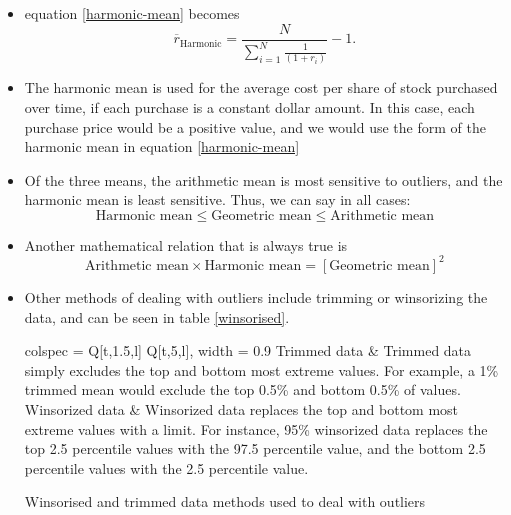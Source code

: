 \documentclass[../notes_compiled.tex]{subfiles}
\begin{document}
\begin{itemize}
\item[] equation \ref{harmonic-mean} becomes
\begin{equation}
\overline{r}_{\text{Harmonic}} = \frac{N}{\sum_{i=1}^{N}\frac{1}{(1+r_{i})}} -1.
\end{equation}

\item The harmonic mean is used for the average cost per share of stock purchased over time, if each purchase is a constant dollar amount. In this case, each purchase price would be a positive value, and we would use the form of the harmonic mean in equation \ref{harmonic-mean}

\item Of the three means, the arithmetic mean is most sensitive to outliers, and the harmonic mean is least sensitive. Thus, we can say in all cases:
\begin{equation}
\text{Harmonic mean} \leq \text{Geometric mean} \leq \text{Arithmetic mean}
\end{equation}

\item Another mathematical relation that is always true is 
\begin{equation}
\text{Arithmetic mean} \times \text{Harmonic mean} = \left[\text{Geometric mean}\right]^{2}
\end{equation}

\item Other methods of dealing with outliers include trimming or winsorizing the data, and can be seen in table \ref{winsorised}.

\begin{table}[h!]
\centering
\begin{tblr}{colspec = {Q[t,1.5,l] Q[t,5,l]}, width = 0.9\textwidth}
\hline[1.25pt]
Trimmed data & Trimmed data simply excludes the top and bottom most extreme values. For example, a 1\% trimmed mean would exclude the top 0.5\% and bottom 0.5\% of values. \\
Winsorized data & Winsorized data replaces the top and bottom most extreme values with a limit. For instance, 95\% winsorized data replaces the top 2.5 percentile values with the 97.5 percentile value, and the bottom 2.5 percentile values with the 2.5 percentile value.\\
\hline[1.25pt]
\end{tblr}
\caption{Winsorised and trimmed data methods used to deal with outliers}
\label{winsorised}
\end{table}

\end{itemize}
\end{document}
